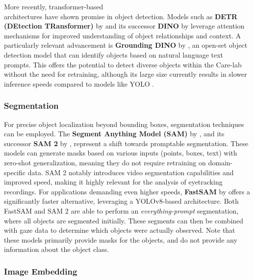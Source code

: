 \documentclass[english]{hogent-article}
\begin{document}
More recently, transformer-based\\ architectures have shown promise in object detection. 
Models such as \textbf{DETR (DEtection TRansformer)} by \textcite{Carion2020} and its successor \textbf{DINO} by \textcite{Zhang2022} 
leverage attention mechanisms for improved understanding of object relationships and context.
A particularly relevant advancement is \textbf{Grounding DINO} by \textcite{Liu2023}, an open-set object detection model that can identify objects based on natural language text prompts.
This offers the potential to detect diverse objects within the Care-lab without the need for retraining, although its large size currently results in slower inference speeds compared to models like YOLO \autocite{Son2024}.

\subsubsection{Segmentation}

For precise object localization beyond bounding boxes, segmentation techniques can be employed.
The \textbf{Segment Anything Model (SAM)} by \textcite{Kirillov2023}, 
and its successor \textbf{SAM 2} by \textcite{Ravi2024}, represent a shift towards promptable segmentation.
These models can generate masks based on various inputs (points, boxes, text) with zero-shot 
generalization, meaning they do not require retraining on domain-specific data.
SAM 2 notably introduces video segmentation capabilities and improved speed, making it highly relevant for the analysis of eyetracking recordings.
For applications demanding even higher speeds, \textbf{FastSAM} by \textcite{Zhao2023} offers a significantly faster alternative, leveraging a YOLOv8-based architecture.
Both FastSAM and SAM 2 are able to perform an \textit{everything-prompt} segmentation, where all objects are segmented initially.
These segments can then be combined with gaze data to determine which objects were actually observed.
Note that these models primarily provide masks for the objects, and do not provide any information about the object class.

\subsubsection{Image Embedding}
\end{document}
